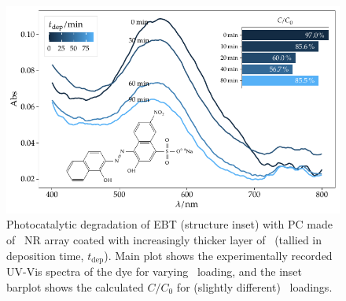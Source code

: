 \documentclass[draft,webedition,openright,titles,swedish,english]{LuaUUThesis}\usepackage[]{graphicx}\usepackage[]{xcolor}
\newenvironment{knitrout}{}{} %
\begin{document}
%









\begin{figure}[btp]
\centering
\begin{knitrout}\scriptsize
{}\color{fgcolor}

{\centering \includegraphics[width=4.72in]{figure/0501P-fig-photocat-1} 

}


\end{knitrout}
\caption[Photodegradation of EBT with ZnO/CdS]{%
   Photocatalytic degradation of \protect\gls{EBT} (structure inset)
   with \protect\gls{PC} made of \zincox\ \protect\gls{NR} array coated
   with increasingly thicker layer of \CdS\ (tallied in deposition time, $t_\mathrm{dep}$).
   Main plot shows the experimentally recorded \protect\gls{UV-Vis} spectra of the dye
   for varying \CdS\ loading, and the inset barplot shows the calculated $C/C_0$
   for (slightly different) \CdS\ loadings.}
\label{fig:P01-photocat}
\end{figure}
\end{document}
